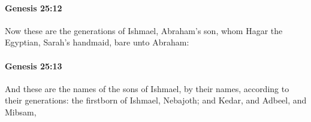 		\paragraph{Genesis 25:12} %
			\label{GENESIS-25-12}

			Now these are the generations of Ishmael, Abraham's son, whom Hagar the Egyptian, Sarah's handmaid, bare unto Abraham:


		\paragraph{Genesis 25:13} %
			\label{GENESIS-25-13}

			And these are the names of the sons of Ishmael, by their names, according to their generations: the firstborn of Ishmael, Nebajoth; and Kedar, and Adbeel, and Mibsam,


